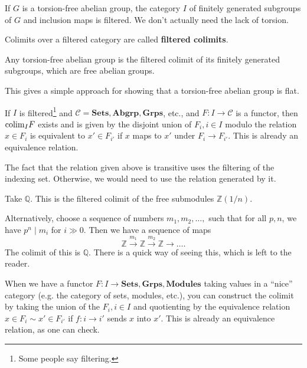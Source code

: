 \begin{example}
If $G$ is a torsion-free abelian group, the category $I$ of finitely generated
subgroups of $G$ and inclusion maps is filtered. We don't actually need the
lack of torsion.
\end{example}

\begin{definition}
Colimits over a filtered category are called \textbf{filtered colimits}.
\end{definition}

\begin{example}
Any torsion-free abelian group is the filtered colimit of its finitely
generated subgroups, which are free abelian groups.
\end{example}
This gives a simple approach for showing that a torsion-free abelian group is
flat.

\begin{proposition}
If $I$ is filtered\footnote{Some people say filtering.} and $\mathcal{C} =
\mathbf{Sets}, \mathbf{Abgrp}, \mathbf{Grps}$, etc., and $F: I \to \mathcal{C}$
is a functor, then $\mathrm{colim}_I F$ exists and is given by the disjoint union of
$F_i, i \in I$ modulo the relation $x \in F_i$ is equivalent to $x' \in F_{i'}$
if $x$ maps to $x'$ under $F_i \to F_{i'}$. This is already an equivalence
relation.
\end{proposition}

The fact that the relation given above is transitive uses the filtering of the
indexing set. Otherwise, we would need to use the relation generated by it.

\begin{example}
Take $\mathbb{Q}$. This is the filtered colimit of the free submodules
$\mathbb{Z}(1/n)$.

Alternatively, choose a sequence of numbers $m_1 , m_2, \dots, $ such that for
all $p, n$, we have $p^n \mid m_i$ for $i \gg 0$. Then we have a sequence of
maps
\[ \mathbb{Z} \stackrel{m_1}{\to} \mathbb{Z} \stackrel{m_2}{\to}\mathbb{Z}
\to \dots.   \]
The colimit of this is $\mathbb{Q}$. There is a quick way of seeing this, which
is left to the reader.
\end{example}

When we have a functor $F: I \to \mathbf{Sets}, \mathbf{Grps},
\mathbf{Modules}$ taking values in a ``nice'' category (e.g. the category of
sets, modules, etc.), you can construct the colimit by taking the union of the
$F_i, i \in I$ and quotienting by the equivalence relation $x \in F_i \sim x'
\in F_{i'}$ if $f: i \to i'$ sends $x$ into $x'$. This is already an
equivalence relation, as one can check.

